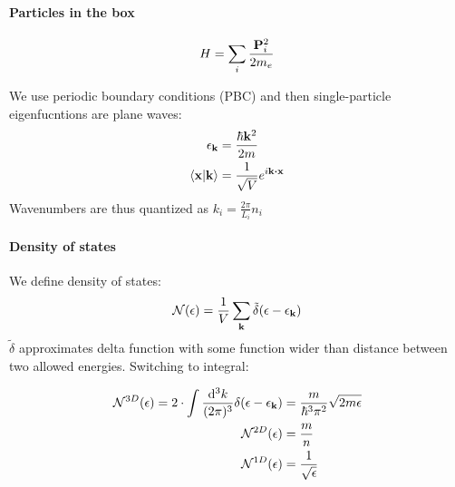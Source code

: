 \paragraph{Particles in the box}
\begin{align}
H = \sum_i \frac{\vb{P}_i^2}{2m_e}
\end{align}

We use periodic boundary conditions (PBC) and then single-particle eigenfucntions are plane waves:
\begin{align}
\epsilon_{\vb{k}} &= \frac{\hbar \vb{k}^2}{2m}\\
\braket{\vb{x}}{\vb{k}} &= \frac{1}{\sqrt{V}} e^{i \vb{k} \vdot \vb{x}}
\end{align}
Wavenumbers are thus quantized as $k_i = \frac{2\pi}{L_i}n_i$

\paragraph{Density of states}
We define density of states:
\begin{align}
\mathcal{N}(\epsilon) = \frac{1}{V}\sum_{\vb{k}} \tilde{\delta}\qty(\epsilon - \epsilon_{\vb{k}})
\end{align}
$\tilde{\delta}$ approximates delta function with some function wider than distance between two allowed energies.
Switching to integral:

\begin{align}
\mathcal{N}^{3D}(\epsilon) = 2\cdot \int \frac{\dd[3]{k}}{(2\pi)^3} \delta(\epsilon - \epsilon_{\vb{k}}) &= \frac{m}{\hbar^3 \pi^2} \sqrt{2m \epsilon}\\
\mathcal{N}^{2D}(\epsilon) &= \frac{m}{n}\\
\mathcal{N}^{1D}(\epsilon) &= \frac{1}{\sqrt{\epsilon}}
\end{align}

